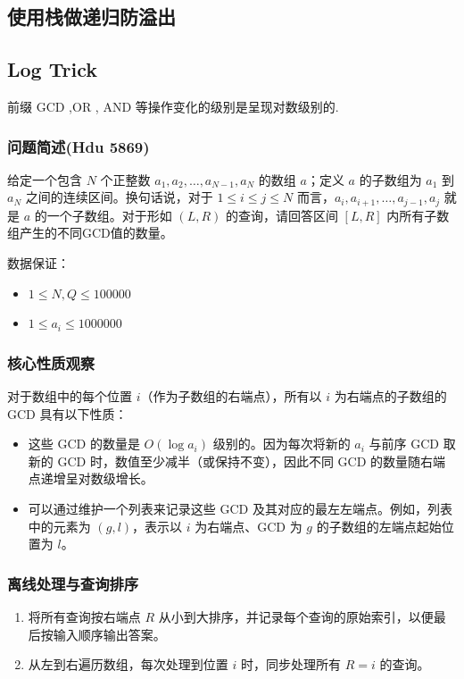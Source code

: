 \documentclass[11pt,a4paper,twocolumn]{ctexart}  %
\begin{document}


\subsection{使用栈做递归防溢出}






\subsection{Log Trick}
前缀 GCD ,OR , AND 等操作变化的级别是呈现对数级别的.
\subsubsection*{问题简述(Hdu 5869)}
给定一个包含 $N$ 个正整数 $a_1, a_2, \dots, a_{N-1}, a_N$ 的数组 $a$；定义 $a$ 的子数组为 $a_1$ 到 $a_N$ 之间的连续区间。换句话说，对于 $1 \leq i \leq j \leq N$ 而言，$a_i, a_{i+1}, \dots, a_{j-1}, a_j$ 就是 $a$ 的一个子数组。对于形如 $(L, R)$ 的查询，请回答区间 $[L, R]$ 内所有子数组产生的不同GCD值的数量。


数据保证：
\begin{itemize}
    \item $1 \leq N, Q \leq 100000$
    \item $1 \leq a_i \leq 1000000$
\end{itemize}

\subsubsection*{核心性质观察}
对于数组中的每个位置 $i$（作为子数组的右端点），所有以 $i$ 为右端点的子数组的 GCD 具有以下性质：
\begin{itemize}
    \item 这些 GCD 的数量是 $O(\log a_i)$ 级别的。因为每次将新的 $a_i$ 与前序 GCD 取新的 GCD 时，数值至少减半（或保持不变），因此不同 GCD 的数量随右端点递增呈对数级增长。
    \item 可以通过维护一个列表来记录这些 GCD 及其对应的最左左端点。例如，列表中的元素为 $(g, l)$，表示以 $i$ 为右端点、GCD 为 $g$ 的子数组的左端点起始位置为 $l$。
\end{itemize}

\subsubsection*{离线处理与查询排序}
\begin{enumerate}
    \item 将所有查询按右端点 $R$ 从小到大排序，并记录每个查询的原始索引，以便最后按输入顺序输出答案。
    \item 从左到右遍历数组，每次处理到位置 $i$ 时，同步处理所有 $R = i$ 的查询。
\end{enumerate}
\end{document}
